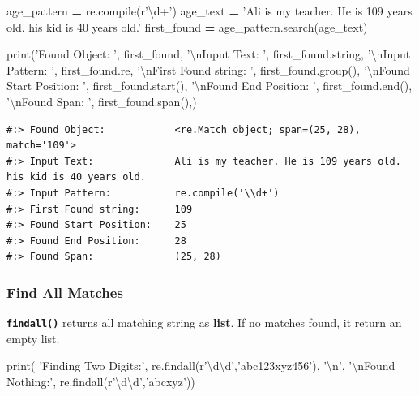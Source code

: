 \documentclass[
]{book}
\newenvironment{Shaded}{\begin{snugshade}}{\end{snugshade}}
\newcommand{\BuiltInTok}[1]{#1}
\newcommand{\CharTok}[1]{\textcolor[rgb]{0.5,0.5,0.5}{#1}}
\newcommand{\NormalTok}[1]{#1}
\newcommand{\OperatorTok}[1]{\textcolor[rgb]{0.43,0.43,0.43}{\textbf{#1}}}
\newcommand{\StringTok}[1]{\textcolor[rgb]{0.5,0.5,0.5}{#1}}
\newcommand{\VerbatimStringTok}[1]{\textcolor[rgb]{0.5,0.5,0.5}{#1}}
\begin{document}
\begin{Shaded}
\begin{Highlighting}[]
\NormalTok{age_pattern }\OperatorTok{=}\NormalTok{ re.}\BuiltInTok{compile}\NormalTok{(}\VerbatimStringTok{r'\textbackslash{}d+'}\NormalTok{)}
\NormalTok{age_text    }\OperatorTok{=} \StringTok{'Ali is my teacher. He is 109 years old. his kid is 40 years old.'}
\NormalTok{first_found }\OperatorTok{=}\NormalTok{ age_pattern.search(age_text)}

\BuiltInTok{print}\NormalTok{(}\StringTok{'Found Object:           '}\NormalTok{, first_found,}
      \StringTok{'}\CharTok{\textbackslash{}n}\StringTok{Input Text:             '}\NormalTok{, first_found.string,}
      \StringTok{'}\CharTok{\textbackslash{}n}\StringTok{Input Pattern:          '}\NormalTok{, first_found.re,}
      \StringTok{'}\CharTok{\textbackslash{}n}\StringTok{First Found string:     '}\NormalTok{, first_found.group(),}
      \StringTok{'}\CharTok{\textbackslash{}n}\StringTok{Found Start Position:   '}\NormalTok{, first_found.start(),}
      \StringTok{'}\CharTok{\textbackslash{}n}\StringTok{Found End Position:     '}\NormalTok{, first_found.end(),}
      \StringTok{'}\CharTok{\textbackslash{}n}\StringTok{Found Span:             '}\NormalTok{, first_found.span(),)}
\end{Highlighting}
\end{Shaded}

\begin{verbatim}
#:> Found Object:            <re.Match object; span=(25, 28), match='109'> 
#:> Input Text:              Ali is my teacher. He is 109 years old. his kid is 40 years old. 
#:> Input Pattern:           re.compile('\\d+') 
#:> First Found string:      109 
#:> Found Start Position:    25 
#:> Found End Position:      28 
#:> Found Span:              (25, 28)
\end{verbatim}

\hypertarget{find-all-matches}{%
\subsubsection{Find All Matches}\label{find-all-matches}}

\textbf{\texttt{findall()}} returns all matching string as \textbf{list}. If no matches found, it return an empty list.

\begin{Shaded}
\begin{Highlighting}[]
\BuiltInTok{print}\NormalTok{(}
  \StringTok{'Finding Two Digits:'}\NormalTok{,}
\NormalTok{  re.findall(}\VerbatimStringTok{r'\textbackslash{}d\textbackslash{}d'}\NormalTok{,}\StringTok{'abc123xyz456'}\NormalTok{), }\StringTok{'}\CharTok{\textbackslash{}n}\StringTok{'}\NormalTok{,}
  \StringTok{'}\CharTok{\textbackslash{}n}\StringTok{Found Nothing:'}\NormalTok{,}
\NormalTok{  re.findall(}\VerbatimStringTok{r'\textbackslash{}d\textbackslash{}d'}\NormalTok{,}\StringTok{'abcxyz'}\NormalTok{))}
\end{Highlighting}
\end{Shaded}
\end{document}
